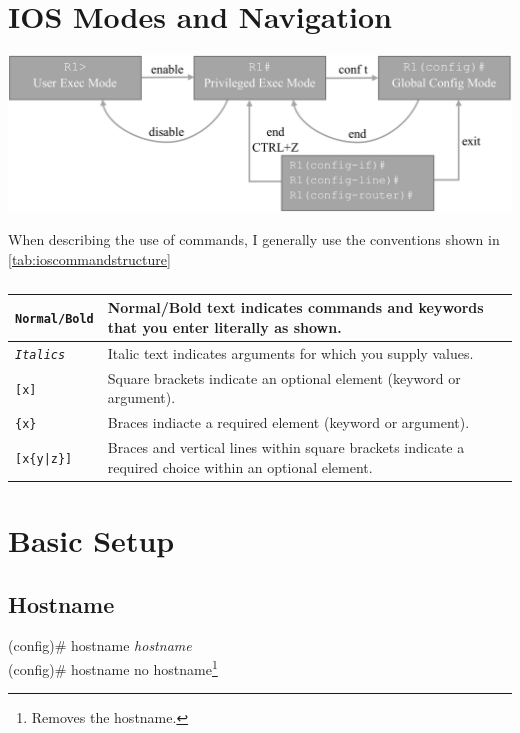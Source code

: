 \section{IOS Modes and Navigation}

\includegraphics[width=\textwidth]{pics/mode-and-nav}

\noindent
When describing the use of commands, I generally use the conventions shown in \autoref{tab:ioscommandstructure}

\begin{table}[h]
{\tabulinesep=1mm			%
\parindent0pt				%
\begin{tabu}{ | l | X | }
	\hline
	\texttt{Normal/\textbf{Bold}} & Normal/\textbf{Bold} text indicates commands and keywords that you enter literally as shown.\\ \hline
	\texttt{\textit{Italics}} & Italic text indicates arguments for which you supply values. \\ \hline
	\texttt{[x]} & Square brackets indicate an optional element (keyword or argument). \\ \hline
	\texttt{\{x\}} & Braces indiacte a required element (keyword or argument). \\ \hline
	\texttt{[x\{y|z\}]} & Braces and vertical lines within square brackets indicate a required choice within an optional element. \\
	\hline

\end{tabu}}
	\caption{}
	\label{tab:ioscommandstructure}
\end{table}

\section{Basic Setup}
\subsection{Hostname}
\ttfamily
	(config)\# hostname \textit{hostname} \\
	(config)\# hostname no hostname\footnote{Removes the hostname.}
	
